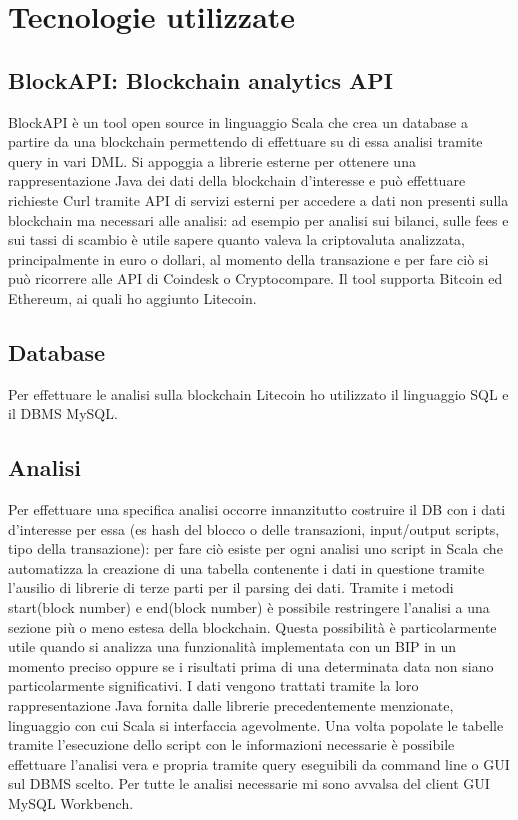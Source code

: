 \chapter{Tecnologie utilizzate}

\section{BlockAPI: Blockchain analytics API}
BlockAPI è un tool open source in linguaggio Scala che crea un database a partire da una blockchain permettendo di effettuare su di essa analisi tramite query in vari DML. Si appoggia a librerie esterne per ottenere una rappresentazione Java dei dati della blockchain d’interesse e può effettuare richieste Curl tramite API di servizi esterni per accedere a dati non presenti sulla blockchain ma necessari alle analisi: ad esempio per analisi sui bilanci, sulle fees e sui tassi di scambio è utile sapere quanto valeva la criptovaluta analizzata, principalmente in euro o dollari, al momento della transazione e per fare ciò si può ricorrere alle API di Coindesk o Cryptocompare. 
Il tool supporta Bitcoin ed Ethereum, ai quali ho aggiunto Litecoin.\\
\section{Database}
Per effettuare le analisi sulla blockchain Litecoin ho utilizzato il linguaggio SQL e il DBMS MySQL.\\
\section{Analisi}
Per effettuare una specifica analisi occorre innanzitutto costruire il DB con i dati d’interesse per essa (es hash del blocco o delle transazioni, input/output scripts, tipo della transazione): per fare ciò esiste per ogni analisi uno script in Scala che automatizza la creazione di una tabella contenente i dati in questione tramite l’ausilio di librerie di terze parti per il parsing dei dati. 
Tramite i metodi start(block number) e end(block number) è possibile restringere l’analisi a una sezione più o meno estesa della blockchain. Questa possibilità è particolarmente utile quando si analizza una funzionalità implementata con un BIP in un momento preciso oppure se i risultati prima di una determinata data non siano particolarmente significativi. I dati vengono trattati tramite la loro rappresentazione Java fornita dalle librerie precedentemente menzionate, linguaggio con cui Scala si interfaccia agevolmente. Una volta popolate le tabelle tramite l’esecuzione dello script con le informazioni necessarie è possibile effettuare l’analisi vera e propria tramite query eseguibili da command line o GUI sul DBMS scelto. Per tutte le analisi necessarie mi sono avvalsa del client GUI MySQL Workbench.

